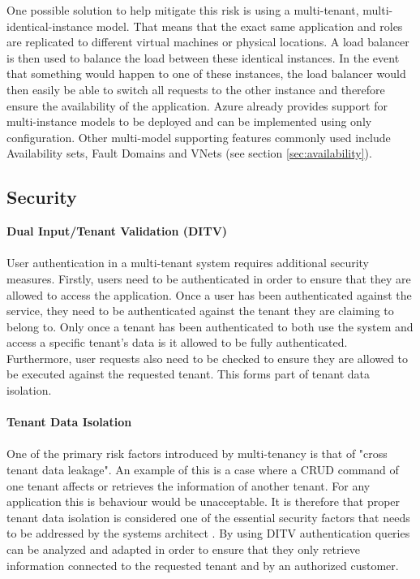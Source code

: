 One possible solution to help mitigate this risk is using a multi-tenant, multi-identical-instance model. That means that the exact same application and roles are replicated to different virtual machines or physical locations. A load balancer is then used to balance the load between these identical instances. In the event that something would happen to one of these instances, the load balancer would then easily be able to switch all requests to the other instance and therefore ensure the availability of the application. Azure already provides support for multi-instance models to be deployed and can be implemented using only configuration. Other multi-model supporting features commonly used include Availability sets, Fault Domains and VNets (see section \ref{sec:availability}).

\subsection{Security}
\label{sec:security} 

\textbf{Dual Input/Tenant Validation (DITV)}
\\
\\
\label{sec:ditv}
User authentication in a multi-tenant system requires additional security measures. Firstly, users need to be authenticated in order to ensure that they are allowed to access the application. Once a user has been authenticated against the service, they need to be authenticated against the tenant they are claiming to belong to. Only once a tenant has been authenticated to both use the system and access a specific tenant's data is it allowed to be fully authenticated. Furthermore, user requests also need to be checked to ensure they are allowed to be executed against the requested tenant. This forms part of tenant data isolation.
\\
\\
\textbf{Tenant Data Isolation}
\\
\\
One of the primary risk factors introduced by multi-tenancy is that of "cross tenant data leakage". An example of this is a case where a CRUD command of one tenant affects or retrieves the information of another tenant. For any application this is behaviour would be unacceptable. It is therefore that proper tenant data isolation is considered one of the essential security factors that needs to be addressed by the systems architect \cite{Wilder2012-so}. By using DITV authentication queries can be analyzed and adapted in order to ensure that they only retrieve information connected to the requested tenant and by an authorized customer.


